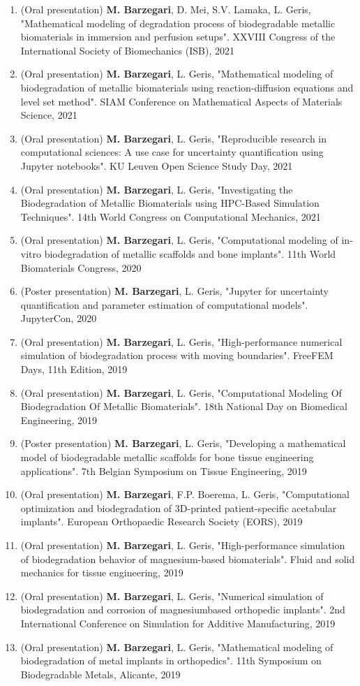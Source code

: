 \documentclass{cv}
\begin{document}
\begin{enumerate}[itemsep=-0.2ex]
\item
(Oral presentation)
\textbf{M. Barzegari}, D. Mei, S.V. Lamaka, L. Geris, "Mathematical modeling of degradation process of biodegradable metallic biomaterials in immersion and perfusion setups". XXVIII Congress of the International Society of Biomechanics (ISB), 2021
\item
(Oral presentation)
\textbf{M. Barzegari}, L. Geris, "Mathematical modeling of biodegradation of metallic biomaterials using reaction-diffusion equations and level set method". SIAM Conference on Mathematical Aspects of Materials Science, 2021
\item
(Oral presentation)
\textbf{M. Barzegari}, L. Geris, "Reproducible research in computational sciences: A use case for uncertainty quantification using Jupyter notebooks". KU Leuven Open Science Study Day, 2021
\item
(Oral presentation)
\textbf{M. Barzegari}, L. Geris, "Investigating the Biodegradation of Metallic Biomaterials using HPC-Based Simulation Techniques". 14th World Congress on Computational Mechanics, 2021
\item
(Oral presentation) 
\textbf{M. Barzegari}, L. Geris, "Computational modeling of in-vitro biodegradation of metallic scaffolds and bone implants". 11th World Biomaterials Congress, 2020
\item
(Poster presentation) 
\textbf{M. Barzegari}, L. Geris, "Jupyter for uncertainty quantification and parameter estimation of computational models". JupyterCon, 2020
\item
(Oral presentation) 
\textbf{M. Barzegari}, L. Geris, "High-performance numerical simulation of biodegradation process with moving boundaries". FreeFEM Days, 11th Edition, 2019
\item
(Oral presentation) 
\textbf{M. Barzegari}, L. Geris, "Computational Modeling Of Biodegradation Of Metallic Biomaterials". 18th National Day on Biomedical Engineering, 2019
\item
(Poster presentation) 
\textbf{M. Barzegari}, L. Geris, "Developing a mathematical model of biodegradable metallic scaffolds for bone tissue engineering applications". 7th Belgian Symposium on Tissue Engineering, 2019
\item
(Oral presentation) 
\textbf{M. Barzegari}, F.P. Boerema, L. Geris, "Computational optimization and biodegradation of 3D-printed patient-specific acetabular implants". European Orthopaedic Research Society (EORS), 2019
\item
(Oral presentation) 
\textbf{M. Barzegari}, L. Geris, "High-performance simulation of biodegradation behavior of magnesium-based biomaterials". Fluid and solid mechanics for tissue engineering, 2019
\item
(Oral presentation) 
\textbf{M. Barzegari}, L. Geris, "Numerical simulation of biodegradation and corrosion of magnesiumbased orthopedic implants". 2nd International Conference on Simulation for Additive Manufacturing, 2019
\item
(Oral presentation) 
\textbf{M. Barzegari}, L. Geris, "Mathematical modeling of biodegradation of metal implants in orthopedics". 11th Symposium on Biodegradable Metals, Alicante, 2019
\end{enumerate}
\end{document}
